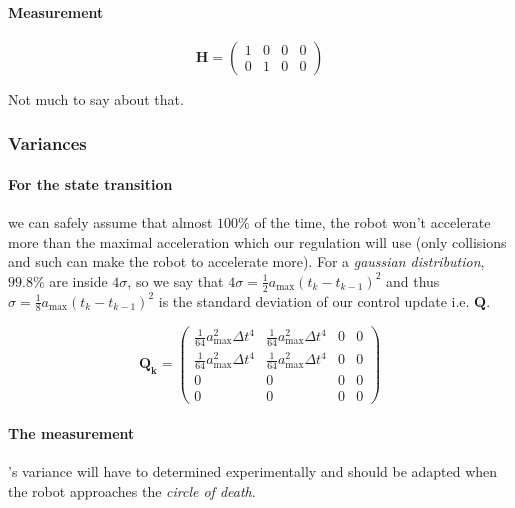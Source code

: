 \documentclass[a4paper, 12pt]{paper}
\begin{document}
\paragraph{Measurement}

\begin{equation}
    \mathbf{H} = \left( \begin{array}{cccc} 1 & 0 & 0 & 0\\
                                            0 & 1 & 0 & 0 \end{array} \right)
\label{eq:h}
\end{equation}

Not much to say about that.

\subsubsection{Variances}

\paragraph{For the state transition}
\label{pg:variance_state_trans}
we can safely assume that almost $100\%$ of the time, the robot
won't accelerate more than the maximal acceleration which our regulation will
use (only collisions and such can make the robot to accelerate more).
For a \emph{gaussian distribution}, $99.8\%$ are inside $4\sigma$, so we say
that $4\sigma = \frac{1}{2} a_{\max} {\left( t_k - t_{k-1} \right)}^2 $ and thus 
$\sigma = \frac{1}{8} a_{\max} {\left( t_k - t_{k-1} \right)}^2 $ is the standard
deviation of our control update i.e. $\mathbf{Q}$.

\begin{equation}
    \mathbf{Q_k} = \left( \begin{array}{cccc}
        \frac{1}{64} a_{\max}^2 \Delta t^4 & \frac{1}{64} a_{\max}^2 \Delta t^4 & 0 & 0\\
        \frac{1}{64} a_{\max}^2 \Delta t^4 & \frac{1}{64} a_{\max}^2 \Delta t^4 & 0 & 0\\
        0 & 0 & 0 & 0 \\
        0 & 0 & 0 & 0 \end{array} \right)
\label{eq:q}
\end{equation}

\paragraph{The measurement}'s variance will have to determined experimentally
and should be adapted when the robot approaches the \emph{circle of death}.
\end{document}
